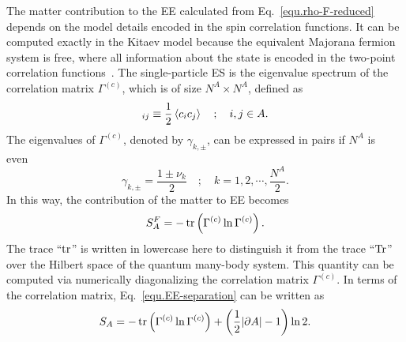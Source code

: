 {
The matter contribution to the EE calculated from Eq.~\eqref{equ.rho-F-reduced} depends on the model details encoded in the spin correlation functions. It can be computed exactly in the Kitaev model because the equivalent Majorana fermion system is free, where all information about the state is encoded in the two-point correlation functions~\cite{Jin-Korepin_2004, Vidal-Latorre-Rico-Kitaev_2003, Latorre-Rico-Vidal_2004, Peschel_2003, Peschel-Eisler_2009, Chung-Peschel_2001, Cheong-Henley_2004}. The single-particle ES is the eigenvalue spectrum of the correlation matrix $\Gamma^{(c)}$, which is of size $N^A\times N^A$, defined as
\begin{equation}
    [\Gamma^{(c)}]_{ij} \equiv \frac{1}{2}\anglelr{c_ic_j}\quad ;\quad i,j\in A.
\end{equation}
The eigenvalues of $\Gamma^{(c)}$, denoted by $\gamma_{k,\pm}$, can be expressed in pairs if $N^A$ is even~\cite{Jin-Korepin_2004, Latorre-Rico-Vidal_2004}
\begin{equation}\label{equ.gamma-eigenvalue}
    \gamma_{k,\pm} = \frac{1 \pm \nu_k}{2} \quad ; \quad k = 1,2,\cdots, \frac{N^A}{2}.
\end{equation}
In this way, the contribution of the matter to EE becomes 
\begin{equation}\label{equ.EE-corr-mat}
    S_A^F = -\tr\left( \Gamma^{(c)}\ln\Gamma^{(c)} \right).
\end{equation}
The trace ``$\tr$'' is written in lowercase here to distinguish it from the trace ``$\Tr$'' over the Hilbert space of the quantum many-body system. This quantity can be computed via numerically diagonalizing the correlation matrix $\Gamma^{(c)}$. In terms of the correlation matrix, Eq.~\eqref{equ.EE-separation} can be written as
\begin{equation}\label{equ.Yao-Qi-standard-form}
    S_A = -\tr\left( \Gamma^{(c)} \ln \Gamma^{(c)} \right) + \left( \frac{1}{2}\abs{\partial A} - 1 \right)\ln 2.
\end{equation}

}
